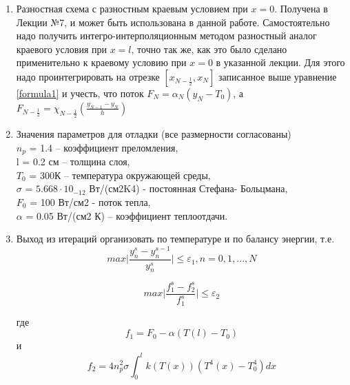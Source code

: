 \begin{enumerate}
\begin{table}[ph!]
\begin{tabular}{|c|c|c|c|c|}
		\end{tabular}
	\end{table}

	\item Разностная схема с разностным краевым условием при $x = 0$. Получена в Лекции №7, и может быть использована в данной работе. Самостоятельно надо получить интегро-интерполяционным методом разностный аналог краевого условия при $x = l$, точно
	так же, как это было сделано применительно к краевому условию при $x = 0$ в указанной 
	лекции. Для этого надо проинтегрировать на отрезке $[x_{N-\frac{1}{2}}, x_N]$ записанное выше уравнение \ref{formula1} и учесть, что поток $F_N = \alpha_N(y_N - T_0)$, а $F_{N - \frac{1}{2}} = \chi_{N - \frac{1}{2}}(\frac{y_{N-1} - y_N}{h})$
	
	\item Значения параметров для отладки (все размерности согласованы)\\
	$n_p$ = 1.4 – коэффициент преломления,\\
	l = 0.2 см – толщина слоя,\\
	$T_0$ = 300К – температура окружающей среды,\\
	$\sigma$ = $5.668 \cdot 10_{-12}$ Вт/(см2K4) - постоянная Стефана- Больцмана,\\
	$F_0$ = 100 Вт/см2 - поток тепла,\\
	$\alpha$ = 0.05 Вт/(см2 К) – коэффициент теплоотдачи. 
	
	\item  Выход из итераций организовать по температуре и по балансу энергии, т.е.
	\begin{equation}\label{formula3}
		max \bigg|\frac{y_n^s - y_n^{s-1}}{y_n^s} \bigg| \leq \varepsilon_1, n = 0, 1, ..., N
	\end{equation}

	\begin{equation}\label{formula4}
		max \bigg|\frac{f_1^s - f_2^s}{f_1^s} \bigg| \leq \varepsilon_2
	\end{equation}
	
	где 
	\begin{equation}\label{formula5}
		f_1 = F_0 - \alpha(T(l) - T_0)
	\end{equation}
	и
	\begin{equation}\label{formula6}
		f_2 = 4n_p^2 \sigma \int_0^l k(T(x))(T^4(x) - T_0^4)dx
	\end{equation}
	
\end{enumerate}







